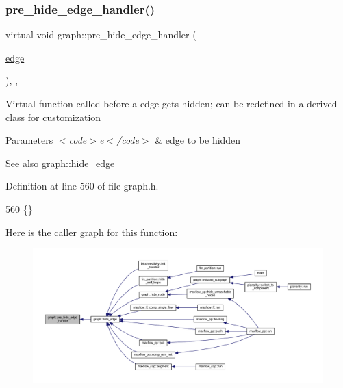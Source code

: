 \subsubsection{\texorpdfstring{pre\+\_\+hide\+\_\+edge\+\_\+handler()}{pre\_hide\_edge\_handler()}}
{\footnotesize\ttfamily virtual void graph\+::pre\+\_\+hide\+\_\+edge\+\_\+handler (\begin{DoxyParamCaption}\item[{\mbox{\hyperlink{classedge}{edge}}}]{ }\end{DoxyParamCaption})\hspace{0.3cm}{\ttfamily [inline]}, {\ttfamily [virtual]}, {\ttfamily [inherited]}}

Virtual function called before a edge gets hidden; can be redefined in a derived class for customization


\begin{DoxyParams}{Parameters}
{\em $<$code$>$e$<$/code$>$} & edge to be hidden \\
\hline
\end{DoxyParams}
\begin{DoxySeeAlso}{See also}
\mbox{\hyperlink{classgraph_ab2f8520bcac080d73c55228fecc61825}{graph\+::hide\+\_\+edge}} 
\end{DoxySeeAlso}


Definition at line 560 of file graph.\+h.


\begin{DoxyCode}
560 \{\}          
\end{DoxyCode}
Here is the caller graph for this function\+:
\nopagebreak
\begin{figure}[H]
\begin{center}
\leavevmode
\includegraphics[width=350pt]{classgraph_aa33201befa6ad7433becd7424d6de55b_icgraph}
\end{center}
\end{figure}
\mbox{\label{classgraph_ac169b1dca0b01c97e683302b3908fd49}} 
